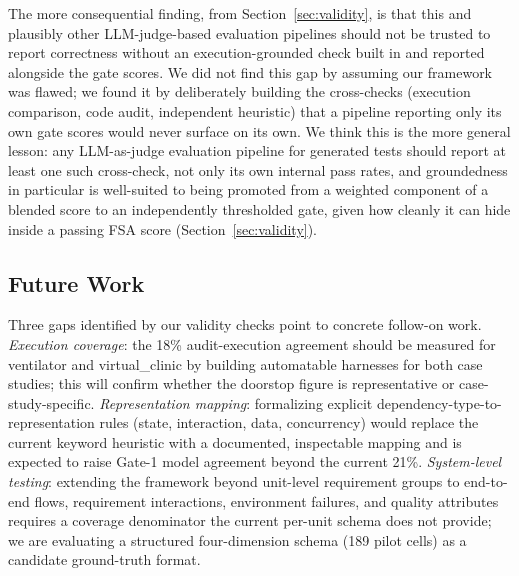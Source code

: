 \documentclass[conference]{IEEEtran}
\begin{document}
  The more consequential finding, from Section~\ref{sec:validity}, is that this
  and plausibly other LLM-judge-based evaluation pipelines should not be
  trusted to report correctness without an execution-grounded check built in
  and reported alongside the gate scores. We did not find this gap by assuming
  our framework was flawed; we found it by deliberately building the
  cross-checks (execution comparison, code audit, independent heuristic) that a
  pipeline reporting only its own gate scores would never surface on its own.
  We think this is the more general lesson: any LLM-as-judge evaluation
  pipeline for generated tests should report at least one such cross-check, not
  only its own internal pass rates, and groundedness in particular is
  well-suited to being promoted from a weighted component of a blended score to
  an independently thresholded gate, given how cleanly it can hide inside a
  passing FSA score (Section~\ref{sec:validity}).

  \subsection*{Future Work}
  Three gaps identified by our validity checks point to concrete follow-on work.
  \textit{Execution coverage}: the 18\% audit-execution agreement should be
  measured for ventilator and virtual\_clinic by building automatable harnesses
  for both case studies; this will confirm whether the doorstop figure is
  representative or case-study-specific. \textit{Representation mapping}:
  formalizing explicit dependency-type-to-representation rules (state,
  interaction, data, concurrency) would replace the current keyword heuristic
  with a documented, inspectable mapping and is expected to raise Gate-1 model
  agreement beyond the current 21\%. \textit{System-level testing}: extending
  the framework beyond unit-level requirement groups to end-to-end flows,
  requirement interactions, environment failures, and quality attributes requires
  a coverage denominator the current per-unit schema does not provide; we are
  evaluating a structured four-dimension schema (189 pilot cells) as a candidate
  ground-truth format.
\end{document}
